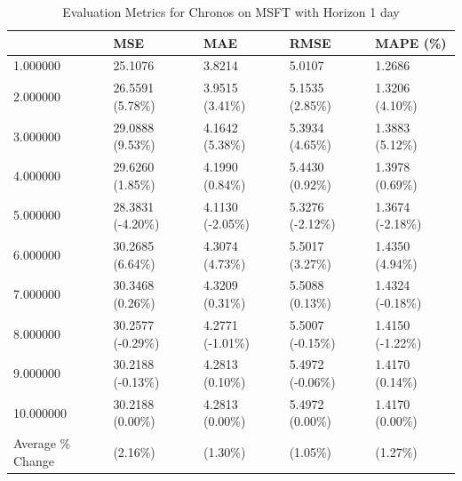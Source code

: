 \begin{table}
\caption{Evaluation Metrics for Chronos on MSFT with Horizon 1 day}
\label{tab:chronos_base_MSFT_h1_metrics}
\begin{tabular}{lllll}
\toprule
 & MSE & MAE & RMSE & MAPE (\%) \\
\midrule
1.000000 & 25.1076 & 3.8214 & 5.0107 & 1.2686 \\
2.000000 & 26.5591 (5.78\%) & 3.9515 (3.41\%) & 5.1535 (2.85\%) & 1.3206 (4.10\%) \\
3.000000 & 29.0888 (9.53\%) & 4.1642 (5.38\%) & 5.3934 (4.65\%) & 1.3883 (5.12\%) \\
4.000000 & 29.6260 (1.85\%) & 4.1990 (0.84\%) & 5.4430 (0.92\%) & 1.3978 (0.69\%) \\
5.000000 & 28.3831 (-4.20\%) & 4.1130 (-2.05\%) & 5.3276 (-2.12\%) & 1.3674 (-2.18\%) \\
6.000000 & 30.2685 (6.64\%) & 4.3074 (4.73\%) & 5.5017 (3.27\%) & 1.4350 (4.94\%) \\
7.000000 & 30.3468 (0.26\%) & 4.3209 (0.31\%) & 5.5088 (0.13\%) & 1.4324 (-0.18\%) \\
8.000000 & 30.2577 (-0.29\%) & 4.2771 (-1.01\%) & 5.5007 (-0.15\%) & 1.4150 (-1.22\%) \\
9.000000 & 30.2188 (-0.13\%) & 4.2813 (0.10\%) & 5.4972 (-0.06\%) & 1.4170 (0.14\%) \\
10.000000 & 30.2188 (0.00\%) & 4.2813 (0.00\%) & 5.4972 (0.00\%) & 1.4170 (0.00\%) \\
Average \% Change & (2.16\%) & (1.30\%) & (1.05\%) & (1.27\%) \\
\bottomrule
\end{tabular}
\end{table}
